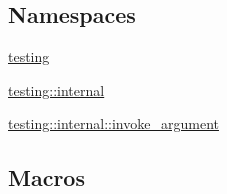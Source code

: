\subsection*{Namespaces}
\begin{DoxyCompactItemize}
\item 
 \mbox{\hyperlink{namespacetesting}{testing}}
\item 
 \mbox{\hyperlink{namespacetesting_1_1internal}{testing\+::internal}}
\item 
 \mbox{\hyperlink{namespacetesting_1_1internal_1_1invoke__argument}{testing\+::internal\+::invoke\+\_\+argument}}
\end{DoxyCompactItemize}
\subsection*{Macros}
